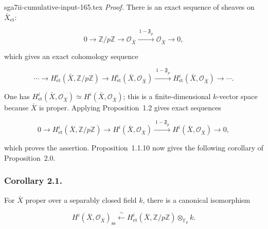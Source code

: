 \begin{filecontents*}{sga7ii-cumulative-input-165.tex}
\medskip
\noindent\emph{Proof.}
There is an exact sequence of sheaves on $\bar X_{\mathrm{et}}$:

\begin{equation}\tag{2.0.4}
0\longrightarrow\mathbb Z/p\mathbb Z\longrightarrow\mathcal O_{\bar X}
\xrightarrow{\ 1-\mathfrak F_p\ }\mathcal O_{\bar X}\longrightarrow0,
\end{equation}

which gives an exact cohomology sequence

\begin{equation}\tag{2.0.5}
\cdots\longrightarrow H^i_{\mathrm{et}}(\bar X,\mathbb Z/p\mathbb Z)
\longrightarrow H^i_{\mathrm{et}}(\bar X,\mathcal O_{\bar X})
\xrightarrow{\ 1-\mathfrak F_p\ }
H^i_{\mathrm{et}}(\bar X,\mathcal O_{\bar X})\longrightarrow\cdots .
\end{equation}

One has
$H^i_{\mathrm{et}}(\bar X,\mathcal O_{\bar X})\simeq
H^i(\bar X,\mathcal O_{\bar X})$; this is a finite-dimensional
$k$-vector space because $\bar X$ is proper. Applying Proposition~1.2 gives
exact sequences

\begin{equation}\tag{2.0.6}
0\longrightarrow H^i_{\mathrm{et}}(\bar X,\mathbb Z/p\mathbb Z)
\longrightarrow H^i(\bar X,\mathcal O_{\bar X})
\xrightarrow{\ 1-\mathfrak F_p\ }
H^i(\bar X,\mathcal O_{\bar X})\longrightarrow0,
\end{equation}

which proves the assertion. Proposition~1.1.10 now gives the following
corollary of Proposition~2.0.

\subsubsection*{Corollary 2.1.}
For $\bar X$ proper over a separably closed field $k$, there is a canonical
isomorphism

\begin{equation}\tag{2.1.1}
H^i(\bar X,\mathcal O_{\bar X})_{\mathrm{ss}}
\xleftarrow{\ \sim\ }
H^i_{\mathrm{et}}(\bar X,\mathbb Z/p\mathbb Z)
\otimes_{\mathbb F_p}k.
\end{equation}
\end{filecontents*}
